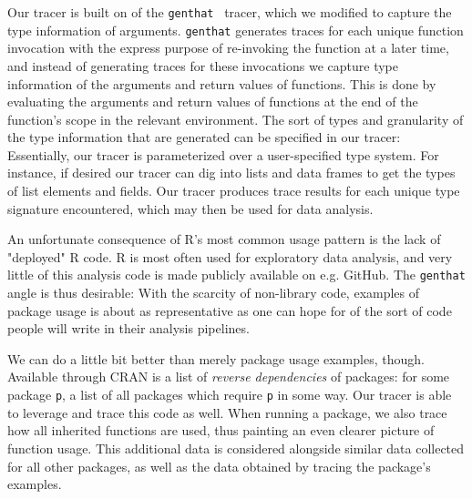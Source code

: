 \documentclass[acmsmall,10pt,review,anonymous]{acmart}\settopmatter{printfolios=true,printccs=false,printacmref=false}
\begin{document}
Our tracer is built on of the {\tt genthat}~\cite{issta18} tracer, which we modified to capture the type information of arguments.  
{\tt genthat} generates traces for each unique function invocation with the express purpose of re-invoking the function at a later time, and instead of generating traces for these invocations we capture type information of the arguments and return values of functions.
This is done by evaluating the arguments and return values of functions at the end of the function's scope in the relevant environment.  
The sort of types and granularity of the type information that are generated can be specified in our tracer: 
Essentially, our tracer is parameterized over a user-specified type system.  
For instance, if desired our tracer can dig into lists and data frames to get the types of list elements and fields.
Our tracer produces trace results for each unique type signature encountered, which may then be used for data analysis.

An unfortunate consequence of R's most common usage pattern is the lack of "deployed" R code. 
R is most often used for exploratory data analysis, and very little of this analysis code is made publicly available on e.g. GitHub.
The {\tt genthat} angle is thus desirable: 
With the scarcity of non-library code, examples of package usage is about as representative as one can hope for of the sort of code people will write in their analysis pipelines.

We can do a little bit better than merely package usage examples, though.
Available through CRAN is a list of {\it reverse dependencies} of packages: 
for some package {\tt p}, a list of all packages which require {\tt p} in some way.  
Our tracer is able to leverage and trace this code as well. 
When running a package, we also trace how all inherited functions are used, thus painting an even clearer picture of function usage.  
This additional data is considered alongside similar data collected for all other packages, as well as the data obtained by tracing the package's examples.

\end{document}
